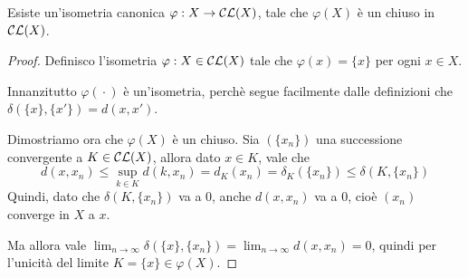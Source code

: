 \begin{lemma}\label{IsometriaCanonica}
	Esiste un'isometria canonica $\varphi: X\to \mathcal{CL}(X)$, tale che $\varphi(X)$ è un chiuso in $\mathcal{CL}(X)$.
\end{lemma}
\begin{proof}
	Definisco l'isometria $\varphi: X\in\mathcal{CL}(X)$ tale che $\varphi(x)=\{x\}$ per ogni $x\in X$. 
	
	Innanzitutto $\varphi({}\cdot{})$ è un'isometria, perchè segue facilmente dalle definizioni che $\delta(\{ x \}, \{ x' \})=d(x,x')$.
	
	Dimostriamo ora che $\varphi(X)$ è un chiuso. Sia $(\{ x_n \})$ una successione convergente a $K\in \mathcal{CL}(X)$, allora dato $x\in K$, vale che
	\begin{equation*}
		d(x,x_n)\le \sup_{k\in K} d(k,x_n)=d_K(x_n)=\delta_K(\{x_n\})\le \delta(K,\{x_n \})
	\end{equation*}
	Quindi, dato che $\delta(K,\{x_n \})$ va a 0, anche $d(x,x_n)$ va a 0, cioè $(x_n)$ converge in $X$ a $x$. 
	
	Ma allora vale $\lim_{n\to\infty} \delta(\{x\}, \{ x_n \})=\lim_{n\to\infty} d(x,x_n)=0$, quindi per l'unicità del limite $K=\{x\}\in\varphi(X)$.
\end{proof}









